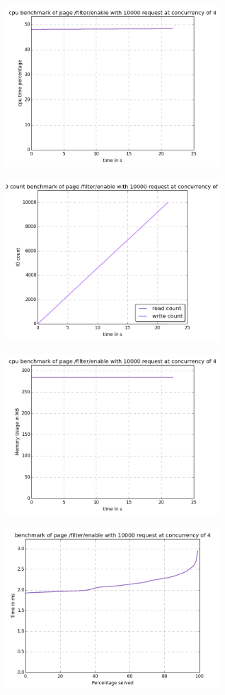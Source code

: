 \begin{center}
\includegraphics[width=0.6\textwidth]{img/filter.enable.cpu.png}



\includegraphics[width=0.6\textwidth]{img/filter.enable.io-count.png}



\includegraphics[width=0.6\textwidth]{img/filter.enable.mem.png}



\includegraphics[width=0.6\textwidth]{img/filter.enable.serv-time.png}




\end{center}
